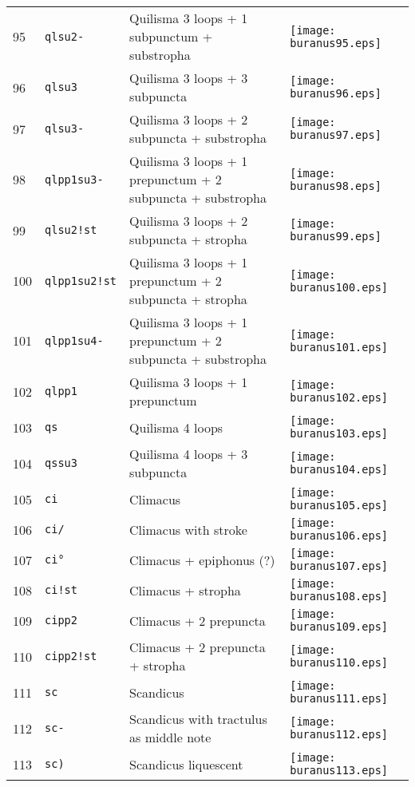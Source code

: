 \documentclass{scrarticle}
\begin{document}
\begin{longtable}{l|l|l|l}
95 & \texttt{qlsu2-} & Quilisma 3 loops + 1 subpunctum + substropha & \texttt{[image: buranus95.eps]} \\
96 & \texttt{qlsu3} & Quilisma 3 loops + 3 subpuncta & \texttt{[image: buranus96.eps]} \\
97 & \texttt{qlsu3-} & Quilisma 3 loops + 2 subpuncta + substropha & \texttt{[image: buranus97.eps]} \\
98 & \texttt{qlpp1su3-} & Quilisma 3 loops + 1 prepunctum + 2 subpuncta + substropha & \texttt{[image: buranus98.eps]} \\
99 & \texttt{qlsu2!st} & Quilisma 3 loops + 2 subpuncta + stropha & \texttt{[image: buranus99.eps]} \\
100 & \texttt{qlpp1su2!st} & Quilisma 3 loops + 1 prepunctum + 2 subpuncta + stropha & \texttt{[image: buranus100.eps]} \\
101 & \texttt{qlpp1su4-} & Quilisma 3 loops + 1 prepunctum + 2 subpuncta + substropha & \texttt{[image: buranus101.eps]} \\
102 & \texttt{qlpp1} & Quilisma 3 loops + 1 prepunctum & \texttt{[image: buranus102.eps]} \\
103 & \texttt{qs} & Quilisma 4 loops & \texttt{[image: buranus103.eps]} \\
104 & \texttt{qssu3} & Quilisma 4 loops + 3 subpuncta & \texttt{[image: buranus104.eps]} \\
105 & \texttt{ci} & Climacus & \texttt{[image: buranus105.eps]} \\
106 & \texttt{ci/} & Climacus with stroke & \texttt{[image: buranus106.eps]} \\
107 & \texttt{ci°} & Climacus + epiphonus (?) & \texttt{[image: buranus107.eps]} \\
108 & \texttt{ci!st} & Climacus + stropha & \texttt{[image: buranus108.eps]} \\
109 & \texttt{cipp2} & Climacus + 2 prepuncta & \texttt{[image: buranus109.eps]} \\
110 & \texttt{cipp2!st} & Climacus + 2 prepuncta + stropha & \texttt{[image: buranus110.eps]} \\
111 & \texttt{sc} & Scandicus & \texttt{[image: buranus111.eps]} \\
112 & \texttt{sc-} & Scandicus with tractulus as middle note & \texttt{[image: buranus112.eps]} \\
113 & \texttt{sc)} & Scandicus liquescent & \texttt{[image: buranus113.eps]} \\\end{longtable}
\end{document}
